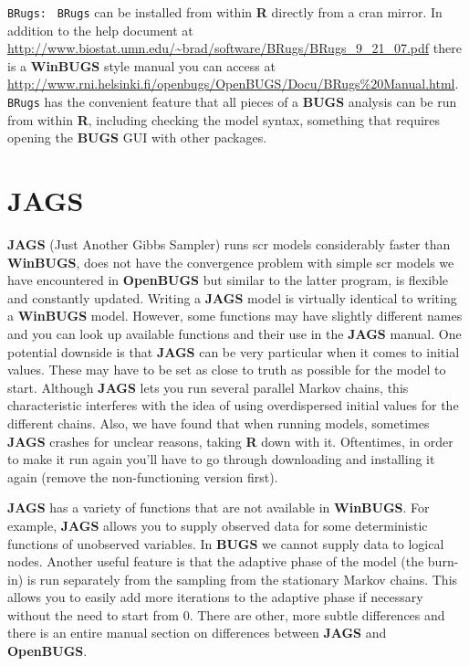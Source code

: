 {\flushleft \tt BRugs: } {\tt BRugs} \citep{thomas_etal:2006} can be
installed from within {\bf R} directly from a cran mirror. In addition
to the help document at
\url{http://www.biostat.umn.edu/~brad/software/BRugs/BRugs_9_21_07.pdf}
there is a {\bf WinBUGS} style manual you can access at
\url{http://www.rni.helsinki.fi/openbugs/OpenBUGS/Docu/BRugs%20Manual.html}.
  {\tt BRugs} has the convenient feature that all pieces of a {\bf
    BUGS} analysis can be run from within {\bf R}, including checking
  the model syntax, something that requires opening the {\bf BUGS} GUI
  with other packages.


\section{JAGS}

{\bf JAGS} (Just Another Gibbs Sampler) \citep{plummer:2003} runs scr models considerably faster than {\bf WinBUGS}, does not have the convergence problem with simple scr models we have encountered in {\bf OpenBUGS} but similar to the latter program, is flexible and constantly updated. Writing a \mbox{\bf JAGS} model is virtually identical to writing a {\bf WinBUGS}
 model. However, some functions may have slightly different names and you 
 can look up available functions and their use in the {\bf JAGS} 
 manual. One potential downside is that {\bf JAGS} can be very particular 
 when it comes to initial values. These may have to be set as close to 
 truth as possible for the model to start. Although {\bf JAGS} lets 
 you run several parallel Markov chains, this characteristic interferes 
 with the idea of using overdispersed initial values for the different 
 chains. Also, we have found that when running models, sometimes {\bf JAGS} crashes for unclear reasons, taking {\bf R} down with it. Oftentimes, in order to make it run again you'll have to go through downloading and installing it again (remove the non-functioning version first).

{\bf JAGS} has a variety of functions that are 
 not available in {\bf WinBUGS}. For example, {\bf JAGS} allows you to 
 supply observed data for some deterministic functions of unobserved 
 variables. In {\bf BUGS} we cannot supply data to logical nodes. 
 Another useful feature is that the adaptive phase of the model 
 (the burn-in) is run separately from the sampling from the stationary 
 Markov chains. This allows you to easily add more iterations to the 
 adaptive phase if necessary without the need to start from 0. There 
 are other, more subtle differences and there is an entire manual section 
 on differences between {\bf JAGS} and {\bf OpenBUGS}.

